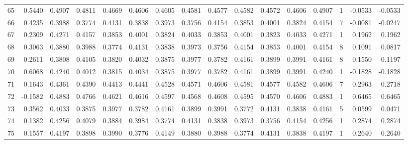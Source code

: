 \begin{tabular}{lrrrrrrrrrrrrrrr}
65  &      0.5440 &  0.4907 &  0.4811 &  0.4669 &  0.4606 &  0.4605 &  0.4581 &  0.4577 &  0.4582 &  0.4572 &   0.4606 &     0.4907 &      1 &                   -0.0533 &                    -0.0533 \\
66  &      0.4235 &  0.3988 &  0.3774 &  0.4131 &  0.3838 &  0.3973 &  0.3756 &  0.4154 &  0.3853 &  0.4001 &   0.3824 &     0.4154 &      7 &                   -0.0081 &                    -0.0247 \\
67  &      0.2309 &  0.4271 &  0.4157 &  0.3853 &  0.4001 &  0.3824 &  0.4033 &  0.3853 &  0.4001 &  0.3823 &   0.4033 &     0.4271 &      1 &                    0.1962 &                     0.1962 \\
68  &      0.3063 &  0.3880 &  0.3988 &  0.3774 &  0.4131 &  0.3838 &  0.3973 &  0.3756 &  0.4154 &  0.3853 &   0.4001 &     0.4154 &      8 &                    0.1091 &                     0.0817 \\
69  &      0.2611 &  0.3808 &  0.4105 &  0.3820 &  0.4032 &  0.3875 &  0.3977 &  0.3782 &  0.4161 &  0.3899 &   0.3991 &     0.4161 &      8 &                    0.1550 &                     0.1197 \\
70  &      0.6068 &  0.4240 &  0.4012 &  0.3815 &  0.4034 &  0.3875 &  0.3977 &  0.3782 &  0.4161 &  0.3899 &   0.3991 &     0.4240 &      1 &                   -0.1828 &                    -0.1828 \\
71  &      0.1643 &  0.4361 &  0.4390 &  0.4413 &  0.4441 &  0.4528 &  0.4571 &  0.4606 &  0.4581 &  0.4577 &   0.4582 &     0.4606 &      7 &                    0.2963 &                     0.2718 \\
72  &     -0.1582 &  0.4883 &  0.4766 &  0.4621 &  0.4616 &  0.4597 &  0.4568 &  0.4608 &  0.4595 &  0.4570 &   0.4606 &     0.4883 &      1 &                    0.6465 &                     0.6465 \\
73  &      0.3562 &  0.4033 &  0.3875 &  0.3977 &  0.3782 &  0.4161 &  0.3899 &  0.3991 &  0.3772 &  0.4131 &   0.3838 &     0.4161 &      5 &                    0.0599 &                     0.0471 \\
74  &      0.1382 &  0.4256 &  0.4079 &  0.3884 &  0.3984 &  0.3774 &  0.4131 &  0.3838 &  0.3973 &  0.3756 &   0.4154 &     0.4256 &      1 &                    0.2874 &                     0.2874 \\
75  &      0.1557 &  0.4197 &  0.3898 &  0.3990 &  0.3776 &  0.4149 &  0.3880 &  0.3988 &  0.3774 &  0.4131 &   0.3838 &     0.4197 &      1 &                    0.2640 &                     0.2640 \\

\end{tabular}
